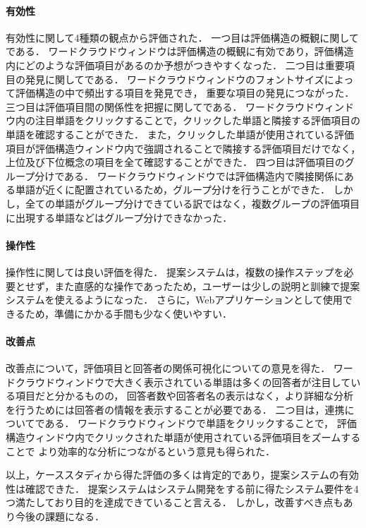 \documentclass[syuuron]{kuee}
\begin{document}
		\paragraph{有効性}
		有効性に関して4種類の観点から評価された．
		一つ目は評価構造の概観に関してである．
		ワードクラウドウィンドウは評価構造の概観に有効であり，評価構造内にどのような評価項目があるのか予想がつきやすくなった．
		二つ目は重要項目の発見に関してである．
		ワードクラウドウィンドウのフォントサイズによって評価構造の中で頻出する項目を発見でき，
		重要な項目の発見につながった．
		三つ目は評価項目間の関係性を把握に関してである．
		ワードクラウドウィンドウ内の注目単語をクリックすることで，クリックした単語と隣接する評価項目の単語を確認することができた．
		また，クリックした単語が使用されている評価項目が評価構造ウィンドウ内で強調されることで隣接する評価項目だけでなく，
		上位及び下位概念の項目を全て確認することができた．
		四つ目は評価項目のグループ分けである．
		ワードクラウドウィンドウでは評価構造内で隣接関係にある単語が近くに配置されているため，グループ分けを行うことができた．
		しかし，全ての単語がグループ分けできている訳ではなく，複数グループの評価項目に出現する単語などはグループ分けできなかった．
		
		\paragraph{操作性}
		操作性に関しては良い評価を得た．
		提案システムは，複数の操作ステップを必要とせず，また直感的な操作であったため，ユーザーは少しの説明と訓練で提案システムを使えるようになった．
		さらに，Webアプリケーションとして使用できるため，準備にかかる手間も少なく使いやすい．
		
		\paragraph{改善点}
		改善点について，評価項目と回答者の関係可視化についての意見を得た．
		ワードクラウドウィンドウで大きく表示されている単語は多くの回答者が注目している項目だと分かるものの，
		回答者数や回答者名の表示はなく，より詳細な分析を行うためには回答者の情報を表示することが必要である．
		二つ目は，連携についてである．
		ワードクラウドウィンドウで単語をクリックすることで，
		評価構造ウィンドウ内でクリックされた単語が使用されている評価項目をズームすることで
		より効率的な分析につながるという意見も得られた．
		
		以上，ケーススタディから得た評価の多くは肯定的であり，提案システムの有効性は確認できた．
		提案システムはシステム開発をする前に得たシステム要件を4つ満たしており目的を達成できていること言える．
		しかし，改善すべき点もあり今後の課題になる．
		
\end{document}

